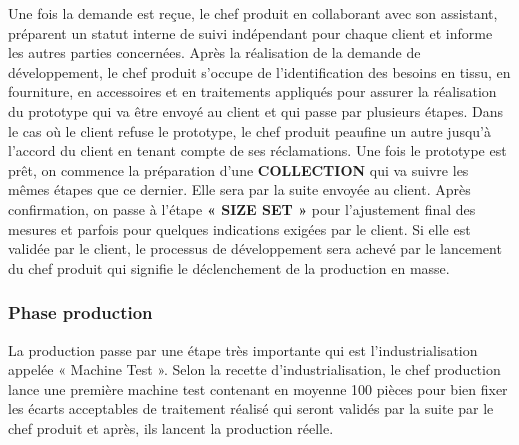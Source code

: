 \documentclass[12pt, a4paper]{thesis}
\begin{document}
Une fois la demande est reçue, le chef produit en collaborant avec son assistant, préparent un statut interne de suivi indépendant pour chaque client et informe les autres parties concernées. Après la réalisation de la demande de développement, le chef produit s’occupe de l’identification des besoins en tissu, en fourniture, en accessoires et en traitements appliqués pour assurer la réalisation du prototype qui va être envoyé au client et qui passe par plusieurs étapes.
Dans le cas où le client refuse le prototype, le chef produit peaufine un autre jusqu’à l’accord du client en tenant compte de ses réclamations. Une fois le prototype est prêt, on commence la préparation d’une \textbf{COLLECTION} qui va suivre les mêmes étapes que ce dernier. Elle sera par la suite envoyée au client. Après confirmation, on passe à l’étape \textbf{« SIZE SET »} pour l’ajustement final des mesures et parfois pour quelques indications exigées par le client. Si elle est validée par le client, le processus de développement sera achevé par le lancement du chef produit qui signifie le déclenchement de la production en masse. 

\subsubsection{Phase production}
La production passe par une étape très importante qui est l’industrialisation appelée « Machine Test ». Selon la recette d’industrialisation, le chef production lance une première machine test contenant en moyenne 100 pièces pour bien fixer les écarts acceptables de traitement réalisé qui seront validés par la suite par le chef produit et après, ils lancent la production réelle.
\end{document}

